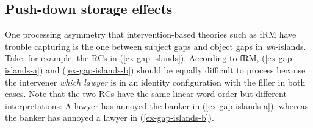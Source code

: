

\subsection{Push-down storage effects}\label{gap-pushdown}

One processing asymmetry that intervention-based theories such as fRM have trouble capturing is the one between subject gaps and object gaps in \textit{wh}-islands. Take, for example, the RCs in (\ref{ex-gap-islands}). According to fRM, (\ref{ex-gap-islands-a}) and (\ref{ex-gap-islands-b}) should be equally difficult to process because the intervener \textit{which lawyer} is in an identity configuration with the filler in both cases. Note that the two RCs have the same linear word order but different interpretations: A lawyer has annoyed the banker in (\ref{ex-gap-islands-a}), whereas the banker has annoyed a lawyer in (\ref{ex-gap-islands-b}).

